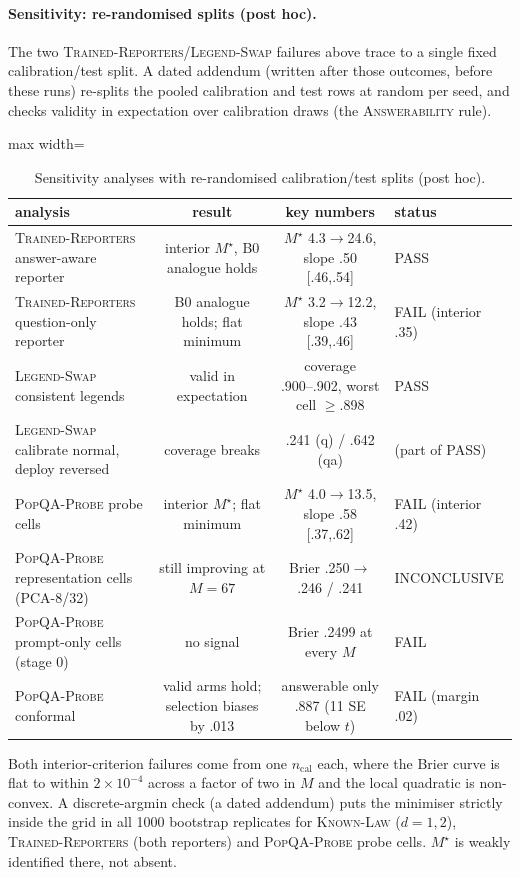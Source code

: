 \documentclass[twoside]{article}
\theoremstyle{definition}
\theoremstyle{remark}
\newcommand{\1}{\mathbf{1}}
\newcommand{\expname}[1]{\textsc{#1}}
\begin{document}
\paragraph{Sensitivity: re-randomised splits (post hoc).} The two \expname{Trained-Reporters}/\expname{Legend-Swap} failures above
trace to a single fixed calibration/test split. A dated addendum (written after those outcomes,
before these runs) re-splits the pooled calibration and test rows at random per seed, and checks
validity in expectation over calibration draws (the \expname{Answerability} rule).
\begin{table}[t]
\caption{Sensitivity analyses with re-randomised calibration/test splits (post hoc).}
\centering\small
\begin{adjustbox}{max width=\textwidth}
\begin{tabular}{lccl}
\toprule
analysis & result & key numbers & status\\
\midrule
\expname{Trained-Reporters} answer-aware reporter & interior $M^\star$, B0 analogue holds & $M^\star$ 4.3$\to$24.6, slope .50 [.46,.54] & PASS\\
\expname{Trained-Reporters} question-only reporter & B0 analogue holds; flat minimum & $M^\star$ 3.2$\to$12.2, slope .43 [.39,.46] & FAIL (interior .35)\\
\expname{Legend-Swap} consistent legends & valid in expectation & coverage .900--.902, worst cell $\ge$.898 & PASS\\
\expname{Legend-Swap} calibrate normal, deploy reversed & coverage breaks & .241 (q) / .642 (qa) & (part of PASS)\\
\expname{PopQA-Probe} probe cells & interior $M^\star$; flat minimum & $M^\star$ 4.0$\to$13.5, slope .58 [.37,.62] & FAIL (interior .42)\\
\expname{PopQA-Probe} representation cells (PCA-8/32) & still improving at $M=67$ & Brier .250$\to$.246 / .241 & INCONCLUSIVE\\
\expname{PopQA-Probe} prompt-only cells (stage 0) & no signal & Brier .2499 at every $M$ & FAIL\\
\expname{PopQA-Probe} conformal & valid arms hold; selection biases by .013 & answerable only .887 (11 SE below $t$) & FAIL (margin .02)\\
\bottomrule
\end{tabular}
\end{adjustbox}
\end{table}
Both interior-criterion failures come from one $n_{\mathrm{cal}}$ each, where the Brier curve is flat
to within $2\times10^{-4}$ across a factor of two in $M$ and the local quadratic is non-convex. A
discrete-argmin check (a dated addendum) puts the minimiser strictly inside the grid in all 1000
bootstrap replicates for \expname{Known-Law} ($d=1,2$), \expname{Trained-Reporters} (both reporters) and \expname{PopQA-Probe} probe cells. $M^\star$ is weakly
identified there, not absent.
\end{document}

